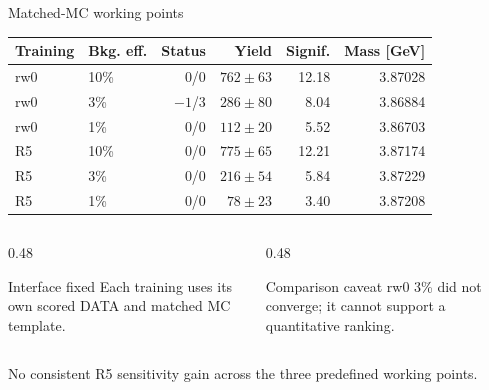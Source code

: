 \documentclass[11pt,aspectratio=169]{beamer}
\begin{document}
\begin{frame}{Matched-MC working points}
  \vspace{4pt}
  \begin{center}
    \small
    \begin{tabular}{llrrrr}
      \toprule
      Training & Bkg. eff. & Status & Yield & Signif. & Mass [GeV] \\
      \midrule
      rw0 & 10\% & 0/0 & $762\pm63$ & 12.18 & 3.87028 \\
      rw0 & 3\%  & $-1$/3 & $286\pm80$ & 8.04 & 3.86884 \\
      rw0 & 1\%  & 0/0 & $112\pm20$ & 5.52 & 3.86703 \\
      \midrule
      R5 & 10\% & 0/0 & $775\pm65$ & 12.21 & 3.87174 \\
      R5 & 3\%  & 0/0 & $216\pm54$ & 5.84 & 3.87229 \\
      R5 & 1\%  & 0/0 & $78\pm23$ & 3.40 & 3.87208 \\
      \bottomrule
    \end{tabular}
  \end{center}
  \vspace{0.3em}
  \begin{columns}[T]
    \begin{column}{0.48\textwidth}
      \begin{block}{Interface fixed}
        Each training uses its own scored DATA and matched MC template.
      \end{block}
    \end{column}
    \begin{column}{0.48\textwidth}
      \begin{alertblock}{Comparison caveat}
        rw0 3\% did not converge; it cannot support a quantitative ranking.
      \end{alertblock}
    \end{column}
  \end{columns}
  \vfill
  \centering\small
  No consistent R5 sensitivity gain across the three predefined working points.
\end{frame}
\end{document}
